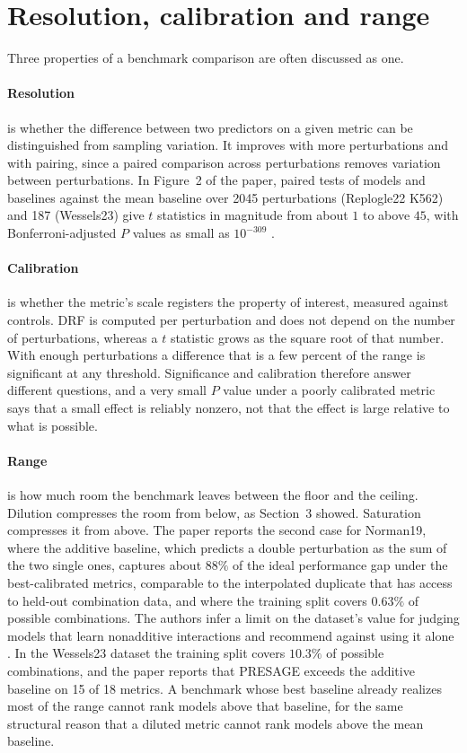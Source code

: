 \documentclass[11pt]{article}
\theoremstyle{definition}
\begin{document}
\section{Resolution, calibration and range}

Three properties of a benchmark comparison are often discussed as one.

\paragraph{Resolution} is whether the difference between two predictors on a given metric can be distinguished from sampling variation. It improves with more perturbations and with pairing, since a paired comparison across perturbations removes variation between perturbations. In Figure~2 of the paper, paired tests of models and baselines against the mean baseline over 2045 perturbations (Replogle22 K562) and 187 (Wessels23) give $t$ statistics in magnitude from about $1$ to above $45$, with Bonferroni-adjusted $P$ values as small as $10^{-309}$ \citep{miller2026}.

\paragraph{Calibration} is whether the metric's scale registers the property of interest, measured against controls. DRF is computed per perturbation and does not depend on the number of perturbations, whereas a $t$ statistic grows as the square root of that number. With enough perturbations a difference that is a few percent of the range is significant at any threshold. Significance and calibration therefore answer different questions, and a very small $P$ value under a poorly calibrated metric says that a small effect is reliably nonzero, not that the effect is large relative to what is possible.

\paragraph{Range} is how much room the benchmark leaves between the floor and the ceiling. Dilution compresses the room from below, as Section~3 showed. Saturation compresses it from above. The paper reports the second case for Norman19, where the additive baseline, which predicts a double perturbation as the sum of the two single ones, captures about $88\%$ of the ideal performance gap under the best-calibrated metrics, comparable to the interpolated duplicate that has access to held-out combination data, and where the training split covers $0.63\%$ of possible combinations. The authors infer a limit on the dataset's value for judging models that learn nonadditive interactions and recommend against using it alone \citep{miller2026}. In the Wessels23 dataset the training split covers $10.3\%$ of possible combinations, and the paper reports that PRESAGE exceeds the additive baseline on 15 of 18 metrics. A benchmark whose best baseline already realizes most of the range cannot rank models above that baseline, for the same structural reason that a diluted metric cannot rank models above the mean baseline.
\end{document}
